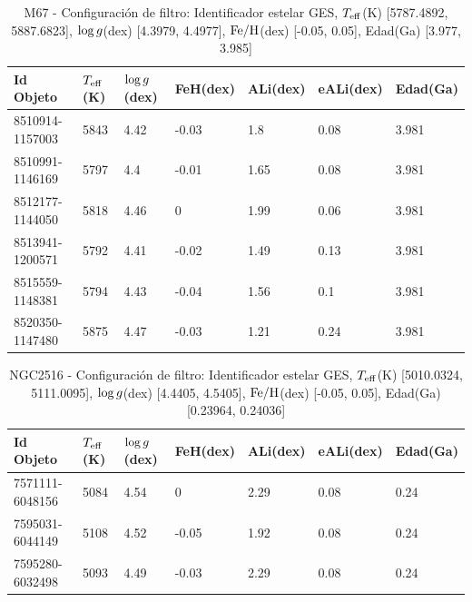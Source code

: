 \begin{longtable}[c]{|l l l l || c c c c c c c c c c|}
	\label{tab:oc_reduced_list}	
\end{longtable}
\newpage
{}
\recalctypearea


\begin{table}
	\centering
	\begin{tabular}{l l l l l l l} 
		\hline
		Id Objeto & $T_{\mathrm{eff}}$(K) & $\mathrm{log} \, g$(dex) & FeH(dex) & ALi(dex) & eALi(dex) & Edad(Ga)\\
		\hline
		8510914-1157003 & 5843 & 4.42 & -0.03 & 1.8 & 0.08 & 3.981\\ 
		8510991-1146169 & 5797 & 4.4 & -0.01 & 1.65 & 0.08 & 3.981\\ 
		8512177-1144050 & 5818 & 4.46 & 0 & 1.99 & 0.06 & 3.981\\ 
		8513941-1200571 & 5792 & 4.41 & -0.02 & 1.49 & 0.13 & 3.981\\ 
		8515559-1148381 & 5794 & 4.43 & -0.04 & 1.56 & 0.1 & 3.981\\ 
		8520350-1147480 & 5875 & 4.47 & -0.03 & 1.21 & 0.24 & 3.981\\ 
		\hline
	\end{tabular}
	\caption{M67 - Configuración de filtro: Identificador estelar GES, $T_{\mathrm{eff}}$(K) [5787.4892, 5887.6823], $\mathrm{log} \, g$(dex) [4.3979, 4.4977], $\mathrm{Fe}/\mathrm{H}$(dex) [-0.05, 0.05], Edad(Ga) [3.977, 3.985]}
	\label{tab:oc_m67}
\end{table}

\begin{table}
	\centering
	\begin{tabular}{l l l l l l l} 
		\hline
		Id Objeto & $T_{\mathrm{eff}}$(K) & $\mathrm{log} \, g$(dex) & FeH(dex) & ALi(dex) & eALi(dex) & Edad(Ga)\\
		\hline
		7571111-6048156 & 5084 & 4.54 & 0 & 2.29 & 0.08 & 0.24\\ 
		7595031-6044149 & 5108 & 4.52 & -0.05 & 1.92 & 0.08 & 0.24\\ 
		7595280-6032498 & 5093 & 4.49 & -0.03 & 2.29 & 0.08 & 0.24\\ 
		\hline
	\end{tabular}
	\caption{NGC2516 - Configuración de filtro: Identificador estelar GES, $T_{\mathrm{eff}}$(K) [5010.0324, 5111.0095], $\mathrm{log} \, g$(dex) [4.4405, 4.5405], $\mathrm{Fe}/\mathrm{H}$(dex) [-0.05, 0.05], Edad(Ga) [0.23964, 0.24036]}
	\label{tab:oc_ngc2516}
\end{table}




